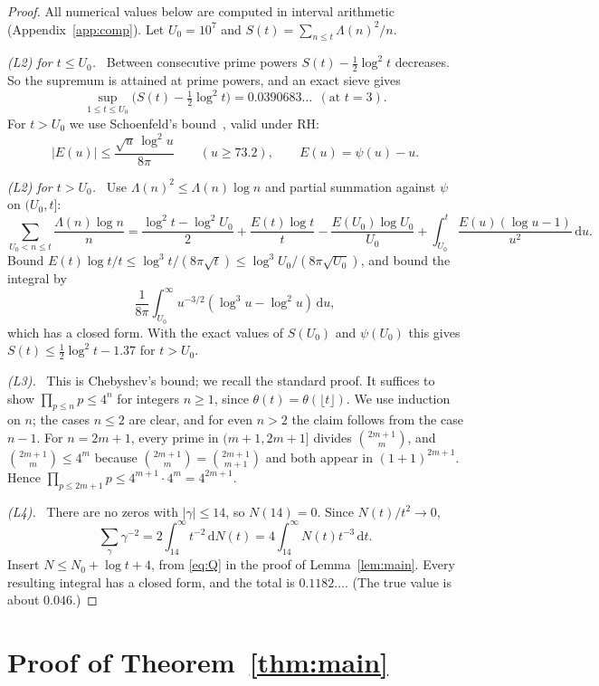 \documentclass[11pt]{amsart}
\theoremstyle{remark}
\newcommand{\dd}{\,\mathrm{d}}
\newcommand{\step}[1]{\smallskip\noindent\textit{#1.}\ }
\begin{document}
\begin{proof}
All numerical values below are computed in interval arithmetic (Appendix~\ref{app:comp}). Let $U_0=10^7$ and $S(t)=\sum_{n\le t}\Lambda(n)^2/n$.

\step{(L2) for $t\le U_0$} Between consecutive prime powers $S(t)-\frac12\log^2t$ decreases. So the supremum is attained at prime powers, and an exact sieve gives
\[
\sup_{1\le t\le U_0}\Big(S(t)-\tfrac12\log^2t\Big)=0.0390683\ldots\ \ (\text{at }t=3).
\]
For $t>U_0$ we use Schoenfeld's bound~\cite[Thm.~10, (6.2)]{Schoenfeld}, valid under RH:
\[
|E(u)|\le\frac{\sqrt u\,\log^2u}{8\pi}\qquad(u\ge73.2),\qquad E(u)=\psi(u)-u .
\]

\step{(L2) for $t>U_0$} Use $\Lambda(n)^2\le\Lambda(n)\log n$ and partial summation against $\psi$ on $(U_0,t]$:
\[
\sum_{U_0<n\le t}\frac{\Lambda(n)\log n}n=\frac{\log^2t-\log^2U_0}2+\frac{E(t)\log t}t-\frac{E(U_0)\log U_0}{U_0}+\int_{U_0}^t\frac{E(u)(\log u-1)}{u^2}\dd u .
\]
Bound $E(t)\log t/t\le\log^3t/(8\pi\sqrt t)\le\log^3U_0/(8\pi\sqrt{U_0})$, and bound the integral by
\[
\frac1{8\pi}\int_{U_0}^\infty u^{-3/2}(\log^3u-\log^2u)\dd u,
\]
which has a closed form. With the exact values of $S(U_0)$ and $\psi(U_0)$ this gives $S(t)\le\frac12\log^2t-1.37$ for $t>U_0$.

\step{(L3)} This is Chebyshev's bound; we recall the standard proof. It suffices to show $\prod_{p\le n}p\le4^n$ for integers $n\ge1$, since $\theta(t)=\theta(\lfloor t\rfloor)$. We use induction on $n$; the cases $n\le2$ are clear, and for even $n>2$ the claim follows from the case $n-1$. For $n=2m+1$, every prime in $(m+1,2m+1]$ divides $\binom{2m+1}{m}$, and $\binom{2m+1}{m}\le4^m$ because $\binom{2m+1}{m}=\binom{2m+1}{m+1}$ and both appear in $(1+1)^{2m+1}$. Hence $\prod_{p\le2m+1}p\le4^{m+1}\cdot4^m=4^{2m+1}$.

\step{(L4)} There are no zeros with $|\gamma|\le14$, so $N(14)=0$. Since $N(t)/t^2\to0$,
\[
\sum_\gamma\gamma^{-2}=2\int_{14}^\infty t^{-2}\dd N(t)=4\int_{14}^\infty N(t)t^{-3}\dd t .
\]
Insert $N\le N_0+\log t+4$, from \eqref{eq:Q} in the proof of Lemma~\ref{lem:main}. Every resulting integral has a closed form, and the total is $0.1182\ldots$. (The true value is about $0.046$.)
\end{proof}

\section{Proof of Theorem~\ref{thm:main}}\label{sec:proof}
\end{document}
